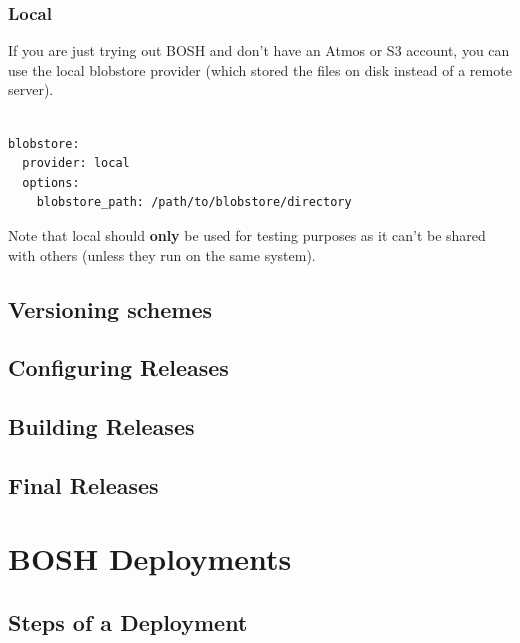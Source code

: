 \subsection{Local}
\label{local}

If you are just trying out BOSH and don't have an Atmos or S3 account, you can use the local blobstore provider (which stored the files on disk instead of a remote server).

\begin{adjustwidth}{2.5em}{2.5em}
\begin{verbatim}

blobstore:
  provider: local
  options:
    blobstore_path: /path/to/blobstore/directory

\end{verbatim}
\end{adjustwidth}

Note that local should \textbf{only} be used for testing purposes as it can't be shared with others (unless they run on the same system).

\section{Versioning schemes}
\label{versioningschemes}

\section{Configuring Releases}
\label{configuringreleases}

\section{Building Releases}
\label{buildingreleases}

\section{Final Releases}
\label{finalreleases}

\chapter{BOSH Deployments}
\label{boshdeployments}

\section{Steps of a Deployment}
\label{stepsofadeployment}

